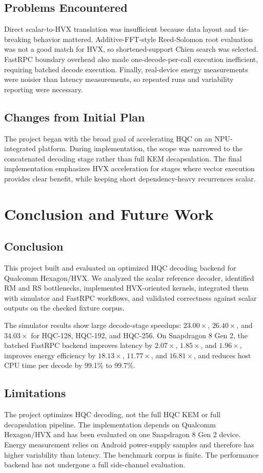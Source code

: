 \documentclass[12pt,a4paper]{report}
\begin{document}
\section{Problems Encountered}
Direct scalar-to-HVX translation was insufficient because data layout and tie-breaking behavior mattered. Additive-FFT-style Reed-Solomon root evaluation was not a good match for HVX, so shortened-support Chien search was selected. FastRPC boundary overhead also made one-decode-per-call execution inefficient, requiring batched decode execution. Finally, real-device energy measurements were noisier than latency measurements, so repeated runs and variability reporting were necessary.

\section{Changes from Initial Plan}
The project began with the broad goal of accelerating HQC on an NPU-integrated platform. During implementation, the scope was narrowed to the concatenated decoding stage rather than full KEM decapsulation. The final implementation emphasizes HVX acceleration for stages where vector execution provides clear benefit, while keeping short dependency-heavy recurrences scalar.

\chapter{Conclusion and Future Work}

\section{Conclusion}
This project built and evaluated an optimized HQC decoding backend for Qualcomm Hexagon/HVX. We analyzed the scalar reference decoder, identified RM and RS bottlenecks, implemented HVX-oriented kernels, integrated them with simulator and FastRPC workflows, and validated correctness against scalar outputs on the checked fixture corpus.

The simulator results show large decode-stage speedups: \(23.00\times\), \(26.40\times\), and \(34.03\times\) for HQC-128, HQC-192, and HQC-256. On Snapdragon 8 Gen 2, the batched FastRPC backend improves latency by \(2.07\times\), \(1.85\times\), and \(1.96\times\), improves energy efficiency by \(18.13\times\), \(11.77\times\), and \(16.81\times\), and reduces host CPU time per decode by 99.1\% to 99.7\%.

\section{Limitations}
The project optimizes HQC decoding, not the full HQC KEM or full decapsulation pipeline. The implementation depends on Qualcomm Hexagon/HVX and has been evaluated on one Snapdragon 8 Gen 2 device. Energy measurement relies on Android power-supply samples and therefore has higher variability than latency. The benchmark corpus is finite. The performance backend has not undergone a full side-channel evaluation.
\end{document}
